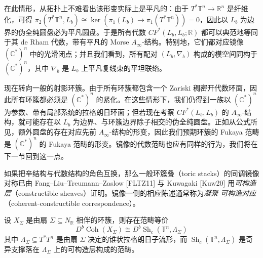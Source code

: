 

在此情形，从拓扑上不难看出该形变实际上是平凡的：由于 $T^{\ast}\mathbb{T}^n\to\mathbb{R}^n$ 是纤维化，可得 $\pi_2 (T^{\ast}\mathbb{T}^n,L_b)\cong\ker (\pi_1 (L_b)\to\pi_1 (T^{\ast}\mathbb{T}^n))=0$，因此以 $L_b$ 为边界的伪全纯圆盘必为平凡圆盘。于是所有代数 $CF^{\ast} (L_b,L_b;\mathbb{R})$ 都可以典范地等同于其 de Rham 代数，带有平凡的 Morse $A_{\infty}$-结构。特别地，它们都对应镜像 $\left(\mathbb{C}^{\ast}\right)^n$ 中的光滑闭点；并且我们看到，所有配对 $(L_b,\nabla_b)$ 构成的模空间同构于 $\left(\mathbb{C}^{\ast}\right)^n$，其中 $\nabla_b$ 是 $L_b$ 上平凡复线束的平坦联络。


现在转向一般的射影环簇。由于所有环簇都包含一个 Zariski 稠密开代数环面，因此所有环簇都必须是 $\left(\mathbb{C}^{\ast}\right)^n$ 的紧化。在这些情形下，我们仍得到一族以 $\left(\mathbb{C}^{\ast}\right)^n$ 为参数、带有局部系统的拉格朗日环面；但若现在考察 $CF^{\ast} (L_b,L_b)$ 的 $A_{\infty}$-结构，就可能存在以 $L_b$ 为边界、与环簇边界除子相交的伪全纯圆盘。正如从公式所见，额外圆盘的存在对应先前 $A_{\infty}$-结构的形变，因此我们预期环簇的 Fukaya 范畴是 $\left(\mathbb{C}^{\ast}\right)^n$ 的 Fukaya 范畴的形变。镜像的代数范畴也应有同样的行为，我们将在下一节回到这一点。

如果把辛结构与代数结构的角色互换，那么一般环簇叠（toric stacks）的同调镜像对称已由 Fang--Liu--Treumann--Zaslow [FLTZ11] 与 Kuwagaki [Kuw20] 用\emph{可构造层}（constructible sheaves）证明。镜像一侧的相应陈述通常称为\emph{凝聚-可构造对应}（coherent-constructible correspondence）。

\begin{theorem*}
设 $X_{\Sigma}$ 是由扇 $\Sigma\subseteq N_{\mathbb{R}}$ 相伴的环簇，则存在范畴等价
\[
  D^b\operatorname{Coh} (X_{\Sigma})\cong D^b\operatorname{Sh}_c (\mathbb{T}^n,\Lambda_{\Sigma})
\]
其中 $\Lambda_{\Sigma}\subseteq T^{\ast} T^n$ 是由扇 $\Sigma$ 决定的锥状拉格朗日子流形，而 $\operatorname{Sh}_c (\mathbb{T}^n, \Lambda_{\Sigma})$ 是奇异支撑落在 $\Lambda_{\Sigma}$ 上的可构造层构成的范畴。
\end{theorem*}

